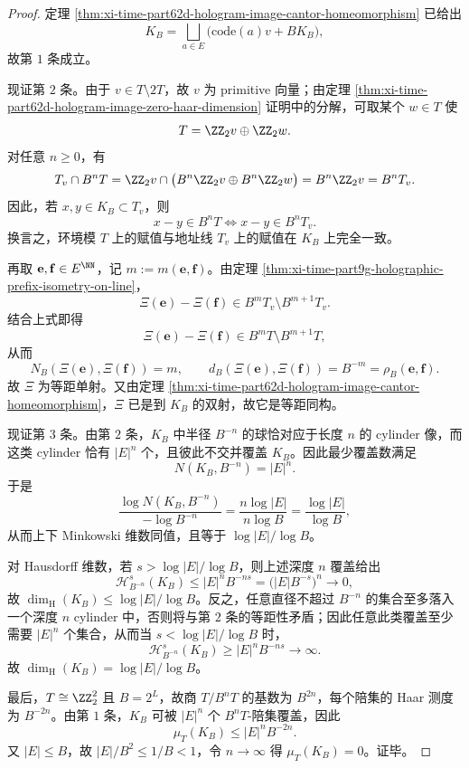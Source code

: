 \begin{proof}
定理 \ref{thm:xi-time-part62d-hologram-image-cantor-homeomorphism} 已给出
\[
K_B
=
\bigsqcup_{a\in E}\bigl(\mathrm{code}(a)v+B K_B\bigr),
\]
故第 \(1\) 条成立。

现证第 \(2\) 条。由于 \(v\in T\setminus 2T\)，故 \(v\) 为 primitive 向量；由定理
\ref{thm:xi-time-part62d-hologram-image-zero-haar-dimension} 证明中的分解，可取某个
\(w\in T\) 使
\[
T=\ZZ_2v\oplus \ZZ_2w.
\]
对任意 \(n\ge 0\)，有
\[
T_v\cap B^nT
=
\ZZ_2v
\cap
\bigl(B^n\ZZ_2v\oplus B^n\ZZ_2w\bigr)
=
B^n\ZZ_2v
=
B^nT_v.
\]
因此，若 \(x,y\in K_B\subset T_v\)，则
\[
x-y\in B^nT
\Longleftrightarrow
x-y\in B^nT_v.
\]
换言之，环境模 \(T\) 上的赋值与地址线 \(T_v\) 上的赋值在 \(K_B\) 上完全一致。

再取 \(\mathbf e,\mathbf f\in E^{\NN}\)，记 \(m:=m(\mathbf e,\mathbf f)\)。由定理
\ref{thm:xi-time-part9g-holographic-prefix-isometry-on-line}，
\[
\Xi(\mathbf e)-\Xi(\mathbf f)\in B^mT_v\setminus B^{m+1}T_v.
\]
结合上式即得
\[
\Xi(\mathbf e)-\Xi(\mathbf f)\in B^mT\setminus B^{m+1}T,
\]
从而
\[
N_B(\Xi(\mathbf e),\Xi(\mathbf f))=m,
\qquad
d_B(\Xi(\mathbf e),\Xi(\mathbf f))=B^{-m}=\rho_B(\mathbf e,\mathbf f).
\]
故 \(\Xi\) 为等距单射。又由定理
\ref{thm:xi-time-part62d-hologram-image-cantor-homeomorphism}，\(\Xi\) 已是到 \(K_B\) 的双射，故它是等距同构。

现证第 \(3\) 条。由第 \(2\) 条，\(K_B\) 中半径 \(B^{-n}\) 的球恰对应于长度 \(n\) 的
cylinder 像，而这类 cylinder 恰有 \(|E|^n\) 个，且彼此不交并覆盖 \(K_B\)。因此最少覆盖数满足
\[
N(K_B,B^{-n})=|E|^n.
\]
于是
\[
\frac{\log N(K_B,B^{-n})}{-\log B^{-n}}
=
\frac{n\log |E|}{n\log B}
=
\frac{\log |E|}{\log B},
\]
从而上下 Minkowski 维数同值，且等于 \(\log|E|/\log B\)。

对 Hausdorff 维数，若 \(s>\log|E|/\log B\)，则上述深度 \(n\) 覆盖给出
\[
\mathcal H^s_{B^{-n}}(K_B)
\le
|E|^nB^{-ns}
=
\bigl(|E|B^{-s}\bigr)^n\to 0,
\]
故 \(\dim_{\mathrm H}(K_B)\le \log|E|/\log B\)。反之，任意直径不超过 \(B^{-n}\) 的集合至多落入一个深度
\(n\) cylinder 中，否则将与第 \(2\) 条的等距性矛盾；因此任意此类覆盖至少需要 \(|E|^n\) 个集合，从而当
\(s<\log|E|/\log B\) 时，
\[
\mathcal H^s_{B^{-n}}(K_B)\ge |E|^nB^{-ns}\to \infty.
\]
故 \(\dim_{\mathrm H}(K_B)=\log|E|/\log B\)。

最后，\(T\cong \ZZ_2^2\) 且 \(B=2^L\)，故商 \(T/B^nT\) 的基数为 \(B^{2n}\)，每个陪集的 Haar
测度为 \(B^{-2n}\)。由第 \(1\) 条，\(K_B\) 可被 \(|E|^n\) 个 \(B^nT\)-陪集覆盖，因此
\[
\mu_T(K_B)\le |E|^nB^{-2n}.
\]
又 \(|E|\le B\)，故 \(|E|/B^2\le 1/B<1\)，令 \(n\to\infty\) 得 \(\mu_T(K_B)=0\)。证毕。
\end{proof}

